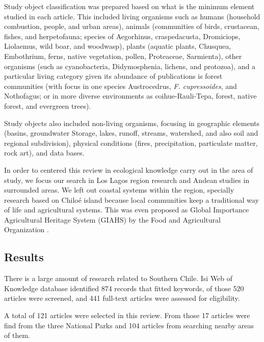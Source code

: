 \documentclass[]{article}
\begin{document}
Study object classification was prepared based on what is the minimum element studied in each article. This included living organisms such as humans (household combustion, people, and urban areas), animals (communities of birds, crustacean, fishes, and herpetofauna; species of Aegorhinus, craspedacusta, Dromiciops, Liolaemus, wild boar, and woodwasp), plants (aquatic plants, Chusquea, Embothrium, ferns, native vegetation, pollen, Proteaceae, Sarmienta), other organisms (such as cyanobacteria, Didymosphenia, lichens, and protozoa), and a particular living category given its abundance of publications is forest communities (with focus in one species Austrocedrus, \emph{F. cupressoides}, and Nothofagus; or in more diverse environments as coihue-Rauli-Tepa, forest, native forest, and evergreen trees).

Study objects also included non-living organisms, focusing in geographic elements (basins, groundwater Storage, lakes, runoff, streams, watershed, and also soil and regional subdivision), physical conditions (fires, precipitation, particulate matter, rock art), and data bases.

In order to centered this review in ecological knowledge carry out in the area of study, we focus our search in Los Lagos region research and Andean studies in surrounded areas. We left out coastal systems within the region, specially research based on Chiloé island because local communities keep a traditional way of life and agricultural systems. This was even proposed as Global Importance Agricultural Heritage System (GIAHS) by the Food and Agricultural Organization \citep{FAO2003Chiloe, FAO2008Chiloe}.

\hypertarget{results}{%
\subsection{Results}\label{results}}

There is a large amount of research related to Southern Chile. Isi Web of Knowledge database identified 874 records that fitted keywords, of those 520 articles were screened, and 441 full-text articles were assessed for eligibility.

A total of 121 articles were selected in this review. From those 17 articles were find from the three National Parks and 104 articles from searching nearby areas of them.
\end{document}
